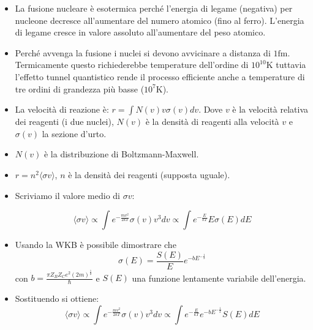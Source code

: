 \documentclass[11pt,a4paper]{article}
\begin{document}
\begin{itemize}
\item La fusione nucleare è esotermica perché l'energia di legame (negativa) per nucleone decresce all'aumentare del numero atomico (fino al ferro). L'energia di legame cresce in valore assoluto all'aumentare del peso atomico.

\item Perché avvenga la fusione i nuclei si devono avvicinare a distanza di $1 \si{\femto \m}$. Termicamente questo richiederebbe temperature dell'ordine di $10^{10} \si{\K}$ tuttavia l'effetto tunnel quantistico rende il processo efficiente anche a temperature di tre ordini di grandezza più basse ($10^{7} \si{\K}$).

\item La velocità di reazione è: $r = \int N(v) v \sigma (v) dv$. Dove $v$ è la velocità relativa dei reagenti (i due nuclei), $N(v)$ è la densità di reagenti alla velocità $v$ e $\sigma(v)$ la sezione d'urto.

\item $N(v)$ è la distribuzione di Boltzmann-Maxwell.

\item $r = n^2 \langle \sigma v \rangle$, $n$ è la densità dei reagenti (supposta uguale).

\item Scriviamo il valore medio di $\sigma v$:

\begin{equation}
\langle \sigma v \rangle \propto \int e^{-\frac{m v^2}{2 k T}} \sigma \left( v \right) v^3 dv \propto \int e^{-\frac{E}{k T}} E \sigma \left( E \right) dE
\end{equation}

\item Usando la WKB è possibile dimostrare che
\begin{equation}
\sigma(E) = \frac{S(E)}{E} e^{- b E^{-\frac{1}{2}}}
\end{equation}
con $b = \frac{\pi Z_B Z_C e^2 ( 2 m)^{\frac{1}{2}}}{\hbar}$ e $S(E)$ una funzione lentamente variabile dell'energia.

\item Sostituendo si ottiene:
\begin{equation}
\langle \sigma v \rangle \propto \int e^{-\frac{m v^2}{2 k T}} \sigma \left( v \right) v^3 dv \propto \int e^{-\frac{E}{k T}} e^{- b E^{-\frac{1}{2}}} S \left( E \right) dE
\end{equation}


\end{itemize}
\end{document}
